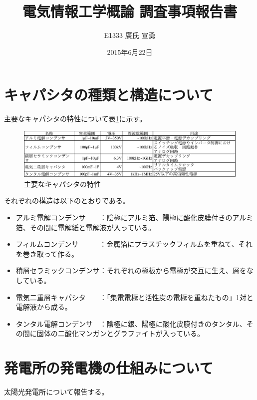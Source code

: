 \documentclass[12pt,titlepage]{ltjsarticle}
\title{\huge 電気情報工学概論 調査事項報告書}
\author{E1333  廣氏 宣勇}
\begin{document}
\date{2015年6月22日}
\maketitle
\section{キャパシタの種類と構造について}

主要なキャパシタの特性について表\ref{tab:r1}に示す。
\begin{figure}[htbp]
    \centering
        \renewcommand{\figurename}{表}
        \caption{主要なキャパシタの特性}
        \label{tab:r1}
        \includegraphics[width=\linewidth]{resc1.pdf}
\end{figure}

それぞれの構造は以下のとおりである。
\begin{itemize}
\item アルミ電解コンデンサ　　：陰極にアルミ箔、陽極に酸化皮膜付きのアルミ箔、その間に電解紙と電解液が入っている。
\item フィルムコンデンサ　　　：金属箔にプラスチックフィルムを重ねて、それを巻き取って作る。
\item 積層セラミックコンデンサ：それぞれの極板から電極が交互に生え、層をなしている。
\item 電気二重層キャパシタ　　：「集電電極と活性炭の電極を重ねたもの」1対と電解液から成る。
\item タンタル電解コンデンサ　：陰極に銀、陽極に酸化皮膜付きのタンタル、その間に固体の二酸化マンガンとグラファイトが入っている。
\end{itemize}

\section{発電所の発電機の仕組みについて}

太陽光発電所について報告する。
\end{document}
